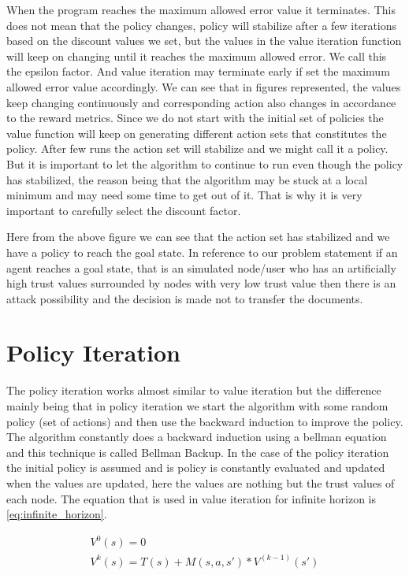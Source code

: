 When the program reaches the maximum allowed error value it terminates. This
does not mean that the policy changes, policy will stabilize after a few
iterations based on the discount values we set, but the values in the value
iteration function will keep on changing until it reaches the maximum allowed
error. We call this the epsilon factor. And value iteration may terminate early
if set the maximum allowed error value accordingly.  We can see that in figures
represented, the values keep changing continuously and corresponding action also
changes in accordance to the reward metrics. Since we do not start with the
initial set of policies the value function will keep on generating different
action sets that constitutes the policy. After few runs the action set will
stabilize and we might call it a policy. But it is important to let the
algorithm to continue to run even though the policy has stabilized, the reason
being that the algorithm may be stuck at a local minimum and may need some time
to get out of it.  That is why it is very important to carefully select the
discount factor.

Here from the above figure we can see that the action set has stabilized and we
have a policy to reach the goal state. In reference to our problem statement if
an agent reaches a goal state, that is  an simulated node/user who has an
artificially high trust values surrounded by nodes with very low trust value
then there is an attack possibility and the decision is made not to transfer the
documents.

\section{Policy Iteration}

The policy iteration works almost similar to value iteration but the difference
mainly being that in policy iteration we start the algorithm with some random
policy (set of actions) and then use the backward induction to improve the
policy. The algorithm constantly does a backward induction using a bellman
equation \autocite{Wikipedia2013} and this technique is called Bellman Backup. In the case of the
policy iteration the initial policy is assumed and is policy is constantly
evaluated and updated when the values are updated, here the values are nothing
but the trust values of each node.  The equation that is used in value iteration
for infinite horizon is \ref{eq:infinite_horizon}.

\begin{equation} 
    \label{eq:infinite_horizon}
    \begin{aligned}
    V^0(s) = 0 \\
    V^k(s) = T(s) + M(s,a,s') * V^(k-1)(s')
    \end{aligned}
\end{equation}

